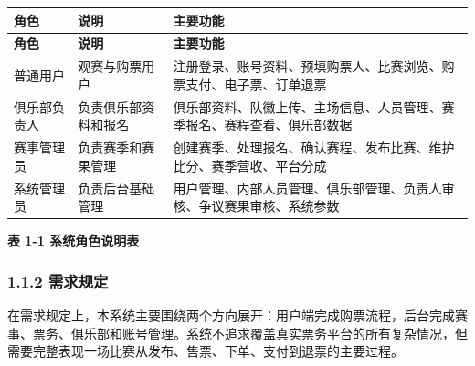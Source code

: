 \documentclass[UTF8,zihao=-4,a4paper]{ctexart}
\newcommand{\tablecaptionline}[1]{\vspace{-1.6em}\begin{center}\small\bfseries #1\end{center}\vspace{0.2em}}
\begin{document}
\begin{center}
\small
\begin{longtable}{>{\raggedright\arraybackslash}p{} >{\raggedright\arraybackslash}p{} >{\raggedright\arraybackslash}p{}}
\toprule
\rowcolor{tablehead}
\textbf{角色} & \textbf{说明} & \textbf{主要功能} \\
\midrule
\endfirsthead
\toprule
\rowcolor{tablehead}
\textbf{角色} & \textbf{说明} & \textbf{主要功能} \\
\midrule
\endhead
普通用户 & 观赛与购票用户 & 注册登录、账号资料、预填购票人、比赛浏览、购票支付、电子票、订单退票 \\
\midrule
俱乐部负责人 & 负责俱乐部资料和报名 & 俱乐部资料、队徽上传、主场信息、人员管理、赛季报名、赛程查看、俱乐部数据 \\
\midrule
赛事管理员 & 负责赛季和赛果管理 & 创建赛季、处理报名、确认赛程、发布比赛、维护比分、赛季营收、平台分成 \\
\midrule
系统管理员 & 负责后台基础管理 & 用户管理、内部人员管理、俱乐部管理、负责人审核、争议赛果审核、系统参数 \\
\midrule
\bottomrule
\end{longtable}
\end{center}

\tablecaptionline{表 1-1 系统角色说明表}

\subsubsection*{1.1.2 需求规定}
{}

在需求规定上，本系统主要围绕两个方向展开：用户端完成购票流程，后台完成赛事、票务、俱乐部和账号管理。系统不追求覆盖真实票务平台的所有复杂情况，但需要完整表现一场比赛从发布、售票、下单、支付到退票的主要过程。
\end{document}
